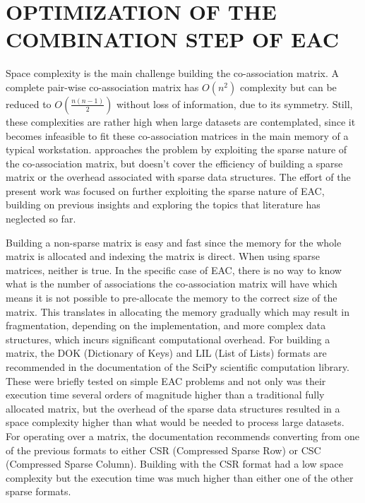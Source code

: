 \section{\uppercase{Optimization of the combination step of EAC}}
\label{sec:combination}

Space complexity is the main challenge building the co-association matrix.
A complete pair-wise co-association matrix has $O(n^2)$ complexity but can be reduced to $O(\frac{n(n-1)}{2})$ without loss of information, due to its symmetry.
Still, these complexities are rather high when large datasets are contemplated, since it becomes infeasible to fit these co-association matrices in the main memory of a typical workstation.
\cite{Lourenco2010} approaches the problem by exploiting the sparse nature of the co-association matrix, but doesn't cover the efficiency of building a sparse matrix or the overhead associated with sparse data structures.
The effort of the present work was focused on further exploiting the sparse nature of EAC, building on previous insights and exploring the topics that literature has neglected so far.

Building a non-sparse matrix is easy and fast since the memory for the whole matrix is allocated and indexing the matrix is direct.
When using sparse matrices, neither is true.
In the specific case of EAC, there is no way to know what is the number of associations the co-association matrix will have which means it is not possible to pre-allocate the memory to the correct size of the matrix.
This translates in allocating the memory gradually which may result in fragmentation, depending on the implementation, and more complex data structures, which incurs significant computational overhead.
For building a matrix, the DOK (Dictionary of Keys) and LIL (List of Lists) formats are recommended in the documentation of the SciPy \cite{JonesSciPy} scientific computation library.
These were briefly tested on simple EAC problems and not only was their execution time several orders of magnitude higher than a traditional fully allocated matrix, but the overhead of the sparse data structures resulted in a space complexity higher than what would be needed to process large datasets.
For operating over a matrix, the documentation recommends converting from one of the previous formats to either CSR (Compressed Sparse Row) or CSC (Compressed Sparse Column).
Building with the CSR format had a low space complexity but the execution time was much higher than either one of the other sparse formats.

